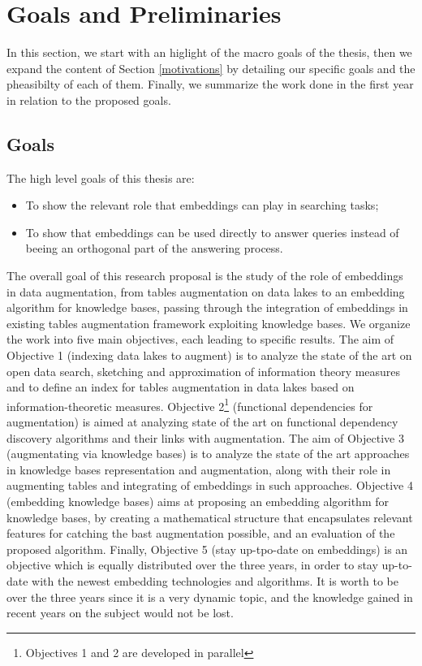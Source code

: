 \section{Goals and Preliminaries}\label{goals}
In this section, we start with an higlight of the macro goals of the thesis, then we expand the content of Section \ref{motivations} by detailing our specific goals and the pheasibilty of each of them. Finally, we summarize the work done in the first year in relation to the proposed goals.

\subsection{Goals}\label{sub_goals}
The high level goals of this thesis are:
\begin{itemize}
    \item To show the relevant role that embeddings can play in searching tasks;
    \item To show that embeddings can be used directly to answer queries instead of beeing an orthogonal part of the answering process.
\end{itemize}

The overall goal of this research proposal is the study of the role of embeddings in data augmentation, from tables augmentation on data lakes to an embedding algorithm for knowledge bases, passing through the integration of embeddings in existing tables augmentation framework exploiting knowledge bases. We organize the work into five main objectives, each leading to specific results. 
The aim of Objective 1 (indexing data lakes to augment) is to analyze the state of the art on open data search, sketching and approximation of information theory measures and to define an index for tables augmentation in data lakes based on information-theoretic measures. 
Objective 2\footnote{Objectives 1 and 2 are developed in parallel} (functional dependencies for augmentation) is aimed at analyzing state of the art on functional dependency discovery algorithms and their links with augmentation. 
The aim of Objective 3 (augmentating via knowledge bases) is to analyze the state of the art approaches in knowledge bases representation and augmentation, along with their role in augmenting tables and integrating of embeddings in such approaches. 
Objective 4 (embedding knowledge bases) aims at proposing an embedding algorithm for knowledge bases, by creating a mathematical structure that encapsulates relevant features for catching the bast augmentation possible, and an evaluation of the proposed algorithm. 
Finally, Objective 5 (stay up-tpo-date on embeddings) is an objective which is equally distributed over the three years, in order to stay up-to-date with the newest embedding technologies and algorithms. It is worth to be over the three years since it is a very dynamic topic, and the knowledge gained in recent years on the subject would not be lost.

